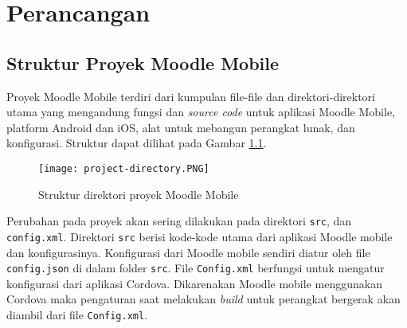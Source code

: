 \chapter{Perancangan}
\label{perancangan} 

\section{Struktur Proyek Moodle Mobile}

Proyek Moodle Mobile terdiri dari kumpulan file-file dan direktori-direktori utama yang mengandung fungsi dan \textit{source code} untuk aplikasi Moodle Mobile, platform Android dan iOS, alat untuk mebangun perangkat lunak, dan konfigurasi. Struktur dapat dilihat pada Gambar \ref{fig:project-directory}.
\begin{figure} [H]
	\centering  
	\texttt{[image: project-directory.PNG]}  
	\caption[Struktur direktori proyek Moodle Mobile] {Struktur direktori proyek Moodle Mobile}
	\label{fig:project-directory} 
\end{figure}  

Perubahan pada proyek akan sering dilakukan pada direktori \texttt{src}, dan \texttt{config.xml}. Direktori \texttt{src} berisi kode-kode utama dari aplikasi Moodle mobile dan konfigurasinya. Konfigurasi dari Moodle mobile sendiri diatur oleh file \texttt{config.json} di dalam folder \texttt{src}. File \texttt{Config.xml} berfungsi untuk mengatur konfigurasi dari aplikasi Cordova. Dikarenakan Moodle mobile menggunakan Cordova maka pengaturan saat melakukan \textit{build} untuk perangkat bergerak akan diambil dari file \texttt{Config.xml}. 